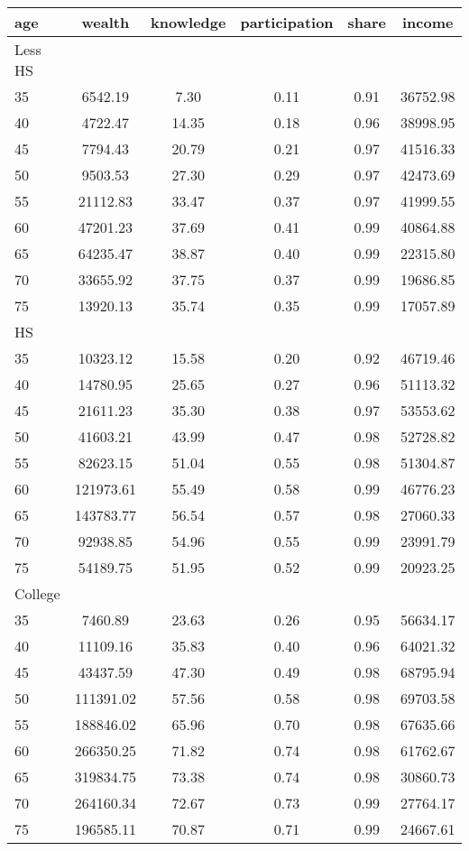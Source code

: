  \begin{tabular}{lccccc}
 \hline \hline
  age & wealth & knowledge & participation & share & income \\
 \hline
 Less HS & & & & & \\
 \hline
35 &   6542.19 &      7.30 &      0.11 &      0.91 &  36752.98 \\ 
40 &   4722.47 &     14.35 &      0.18 &      0.96 &  38998.95 \\ 
45 &   7794.43 &     20.79 &      0.21 &      0.97 &  41516.33 \\ 
50 &   9503.53 &     27.30 &      0.29 &      0.97 &  42473.69 \\ 
55 &  21112.83 &     33.47 &      0.37 &      0.97 &  41999.55 \\ 
60 &  47201.23 &     37.69 &      0.41 &      0.99 &  40864.88 \\ 
65 &  64235.47 &     38.87 &      0.40 &      0.99 &  22315.80 \\ 
70 &  33655.92 &     37.75 &      0.37 &      0.99 &  19686.85 \\ 
75 &  13920.13 &     35.74 &      0.35 &      0.99 &  17057.89 \\ 
 \hline
 HS & & & & & \\
 \hline
35 &  10323.12 &     15.58 &      0.20 &      0.92 &  46719.46 \\ 
40 &  14780.95 &     25.65 &      0.27 &      0.96 &  51113.32 \\ 
45 &  21611.23 &     35.30 &      0.38 &      0.97 &  53553.62 \\ 
50 &  41603.21 &     43.99 &      0.47 &      0.98 &  52728.82 \\ 
55 &  82623.15 &     51.04 &      0.55 &      0.98 &  51304.87 \\ 
60 & 121973.61 &     55.49 &      0.58 &      0.99 &  46776.23 \\ 
65 & 143783.77 &     56.54 &      0.57 &      0.98 &  27060.33 \\ 
70 &  92938.85 &     54.96 &      0.55 &      0.99 &  23991.79 \\ 
75 &  54189.75 &     51.95 &      0.52 &      0.99 &  20923.25 \\ 
 \hline
 College & & & & & \\
 \hline
35 &   7460.89 &     23.63 &      0.26 &      0.95 &  56634.17 \\ 
40 &  11109.16 &     35.83 &      0.40 &      0.96 &  64021.32 \\ 
45 &  43437.59 &     47.30 &      0.49 &      0.98 &  68795.94 \\ 
50 & 111391.02 &     57.56 &      0.58 &      0.98 &  69703.58 \\ 
55 & 188846.02 &     65.96 &      0.70 &      0.98 &  67635.66 \\ 
60 & 266350.25 &     71.82 &      0.74 &      0.98 &  61762.67 \\ 
65 & 319834.75 &     73.38 &      0.74 &      0.98 &  30860.73 \\ 
70 & 264160.34 &     72.67 &      0.73 &      0.99 &  27764.17 \\ 
75 & 196585.11 &     70.87 &      0.71 &      0.99 &  24667.61 \\ 
 \hline \hline
 \end{tabular}
